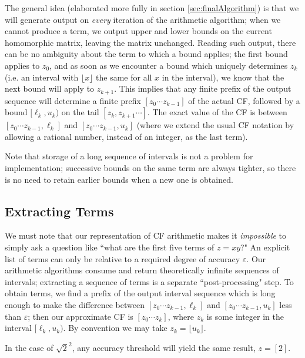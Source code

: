 \documentclass[11pt, oneside]{amsart}   	%
\begin{document}
The general idea (elaborated more fully in section \ref{sec:finalAlgorithm}) is that we will generate output on \emph{every}
 iteration of the arithmetic algorithm; when we cannot produce a term, we output upper and lower bounds on the current homomorphic matrix, leaving the matrix unchanged. Reading such output, there can be no ambiguity about the term to which a bound 
 applies; the first bound applies to $z_0$, and as soon as we encounter a bound which uniquely determines $z_k$ (i.e. an interval with $\lfloor x \rfloor$ the same for all $x$ in the interval), we know that the next bound will apply to $z_{k+1}$. This implies that any 
 finite prefix of the output sequence will determine a finite prefix $[z_0 \cdots z_{k-1}]$ of the actual CF, followed by a bound $[\ell_k,u_k)$ on the tail $[z_k, z_{k+1}\cdots]$. The exact value of the CF is between $[z_0 \cdots z_{k-1}, \ell_k]$ and $[z_0 \cdots z_{k-1}, u_k]$ (where we extend the usual CF notation by allowing a rational number, instead of an integer, as the last term).

Note that storage of a long sequence of intervals is not a problem for implementation; successive bounds on the same term are always tighter, so there is no need to retain earlier bounds when a new one is obtained. 

\subsection{Extracting Terms}
We must note that our representation of CF arithmetic makes it \emph{impossible} to simply ask a question like ``what are the first five terms of $z = xy$?" An explicit list of terms can only be relative to a required degree of accuracy $\varepsilon$. Our arithmetic algorithms consume and return theoretically infinite sequences of intervals; extracting a sequence of terms is a separate ``post-processing" step. To obtain terms, we find a prefix of the output interval sequence which is long enough to make the difference between $[z_0 \cdots z_{k-1}, \ell_k]$ and $[z_0 \cdots z_{k-1}, u_k]$ less than $\varepsilon$; then our approximate CF is $[z_0 \cdots z_k]$, where $z_k$ is some integer in the interval $[\ell_k,u_k)$. By convention we may take $z_k = \lfloor u_k \rfloor$. 

In the case of $\sqrt{2}^2$, any accuracy threshold will yield the same result, $z = [2]$.
\end{document}
